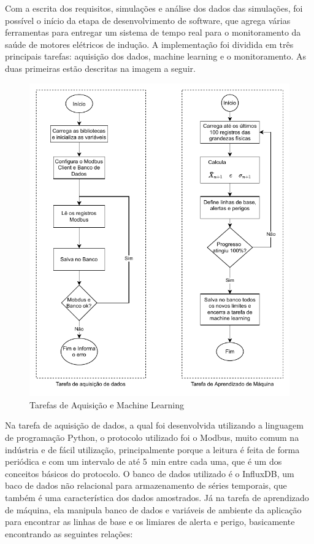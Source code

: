 Com a escrita dos requisitos, simulações e análise dos dados das simulações, foi possível o início da etapa de desenvolvimento de software,
que agrega várias ferramentas para entregar um sistema de tempo real para o monitoramento da saúde de motores elétricos de indução. A 
implementação foi dividida em três principais tarefas: aquisição dos dados, machine learning e o monitoramento. As duas primeiras estão
descritas na imagem a seguir.

\begin{figure}[H]
    \caption{Tarefas de Aquisição e Machine Learning}
    \begin{center}
        \includegraphics[scale=1, page=1]{metodologia/img/software.pdf}
    \end{center}
    \label{fig:tarefa_aq_ml}
\end{figure}

Na tarefa de aquisição de dados, a qual foi desenvolvida utilizando a linguagem de programação Python, o protocolo utilizado foi o Modbus, 
muito comum na indústria e de fácil utilização, principalmente porque a leitura é feita de forma periódica e com um intervalo de até 
\SI{5}{\minute} entre cada uma, que é um dos conceitos básicos do protocolo. O banco de dados utilizado é o InfluxDB, um baco de dados não 
relacional para armazenamento de séries temporais, que também é uma característica dos dados amostrados.
Já na tarefa de aprendizado de máquina, ela  manipula banco de dados e variáveis de ambiente da aplicação para encontrar as linhas de base e
os limiares de alerta e perigo, basicamente encontrando as seguintes relações:

